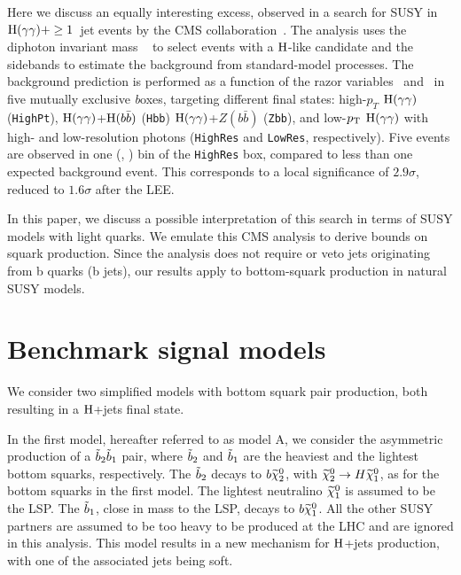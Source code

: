 Here we discuss an equally interesting excess, observed in a search for SUSY in $\mathrm{H} (\gamma\gamma)+ \geq 1$~jet events by the CMS collaboration~\cite{RazorHgaga}. The analysis uses the diphoton invariant mass \mgaga~ to select events with a $\mathrm{H}$-like candidate and the \mgaga~ sidebands to estimate the background from standard-model processes. The background prediction is performed as a function of the razor variables \MR~and \Rsq~in five mutually exclusive {\textit boxes}, targeting different final states: high-$p_T$ $\mathrm{H} (\gamma\gamma)$ (\texttt{HighPt}), $\mathrm{H} (\gamma\gamma)$+$\mathrm{H} (b \bar b)$ (\texttt{Hbb}) $\mathrm{H} (\gamma\gamma)$+$Z (b \bar b)$ (\texttt{Zbb}), and low-$p_{\mathrm{T}}$ $\mathrm{H} (\gamma\gamma)$ with high- and low-resolution photons (\texttt{HighRes} and \texttt{LowRes}, respectively). Five events are observed in one (\MR, \Rsq) bin of the \texttt{HighRes} box, compared to less than one expected background event. This corresponds to a local significance of $2.9\sigma$, reduced to $1.6\sigma$ after the LEE. 

In this paper, we discuss a possible interpretation of this search in terms of SUSY models with light quarks. We emulate this CMS analysis to derive bounds on squark production. Since the analysis does not require or veto jets originating from b quarks (b jets), our results apply to bottom-squark production in natural SUSY models. 

\section{Benchmark signal models}
\label{sec:models}

We consider two simplified models with bottom squark pair production, both
resulting in a $\mathrm{H}$+jets final state.

In the first model, hereafter referred to as model A, we consider the
asymmetric production of a $\tilde{b}_2
\tilde{b}_1$ pair, where $\tilde{b}_2$ and $\tilde{b}_1$ are the heaviest
and the lightest bottom squarks, respectively. The $\tilde{b}_2$ decays
to $b \widetilde{\chi}^{0}_2$, with $\widetilde{\chi}^{0}_2 \to H \widetilde{\chi}^{0}_1$, as for the bottom
squarks in the first model. The lightest neutralino $\widetilde{\chi}^{0}_1$ is
assumed to be the LSP. The $\tilde{b}_1$, close in mass to the LSP,
decays to $b \widetilde{\chi}^{0}_1$. All the other SUSY partners are assumed to be
too heavy to be produced at the LHC and are ignored in this analysis. This model results in a new mechanism for
$\mathrm{H}$+jets production, with one of the associated jets being soft. 

